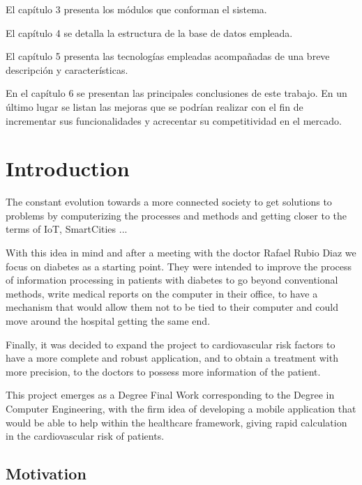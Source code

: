 \documentclass[11pt,spanish,
		listoftables,listoffigures]
		{tfgplantilla}
\begin{document}
El capítulo 3 presenta los módulos que conforman el sistema.

El capítulo 4 se detalla la estructura de la base de datos empleada.

El capítulo 5 presenta las tecnologías empleadas acompañadas de una breve descripción y características.

En el capítulo 6 se presentan las principales conclusiones de este trabajo. En un último lugar se listan las mejoras que se podrían realizar con el fin de incrementar sus funcionalidades y acrecentar su competitividad en el mercado.


\addtocounter{chapter}{-1}
\chapter{Introduction}

The constant evolution towards a more connected society to get solutions to problems by computerizing the processes and methods and getting closer to the terms of IoT, SmartCities ...

With this idea in mind and after a meeting with the doctor Rafael Rubio Diaz we focus on diabetes as a starting point. They were intended to improve the process of information processing in patients with diabetes to go beyond conventional methods, write medical reports on the computer in their office, to have a mechanism that would allow them not to be tied to their computer and could move around the hospital getting the same end.

Finally, it was decided to expand the project to cardiovascular risk factors to have a more complete and robust application, and to obtain a treatment with more precision, to the doctors to possess more information of the patient.

This project emerges as a Degree Final Work corresponding to the Degree in Computer Engineering, with the firm idea of developing a mobile application that would be able to help within the healthcare framework, giving rapid calculation in the cardiovascular risk of patients.

\section{Motivation}
\end{document}
